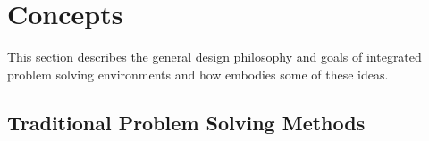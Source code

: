 %
% 
% 
% 
% 
% 
%


\chapter{Concepts}
\label{ch:concepts} 

This section describes the general design philosophy and goals of
integrated problem solving environments  and how \sr{} embodies some of these ideas.

\section{Traditional Problem Solving Methods}

